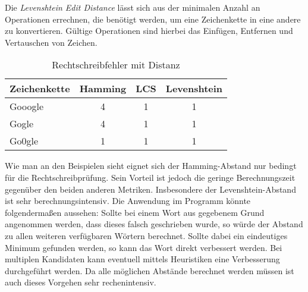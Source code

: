 \newline
Die \textit{Levenshtein Edit Distance} lässt sich aus der minimalen Anzahl an Operationen errechnen, die benötigt werden, um eine Zeichenkette in eine andere zu konvertieren. Gültige Operationen sind hierbei das Einfügen, Entfernen und Vertauschen von Zeichen.
\newline
\begin{table}
\center
\begin{tabular}{|l|ccc|}
\hline
Zeichenkette & Hamming & LCS & Levenshtein \\
\hline
Gooogle & 4 & 1 & 1 \\
Gogle & 4 & 1 & 1 \\
Go0gle & 1 & 1 & 1 \\
\hline
\end{tabular}
\caption{Rechtschreibfehler mit Distanz}
\end{table}
\newline
Wie man an den Beispielen sieht eignet sich der Hamming-Abstand nur bedingt für die Rechtschreibprüfung. Sein Vorteil ist jedoch die geringe Berechnungszeit gegenüber den beiden anderen Metriken. Insbesondere der Levenshtein-Abstand ist sehr berechnungsintensiv.
\newline
Die Anwendung im Programm könnte folgendermaßen aussehen: Sollte bei einem Wort aus gegebenem Grund angenommen werden, dass dieses falsch geschrieben wurde, so würde der Abstand zu allen weiteren verfügbaren Wörtern berechnet. Sollte dabei ein eindeutiges Minimum gefunden werden, so kann das Wort direkt verbessert werden. Bei multiplen Kandidaten kann eventuell mittels Heuristiken eine Verbesserung durchgeführt werden. Da alle möglichen Abstände berechnet werden müssen ist auch dieses Vorgehen sehr rechenintensiv.


